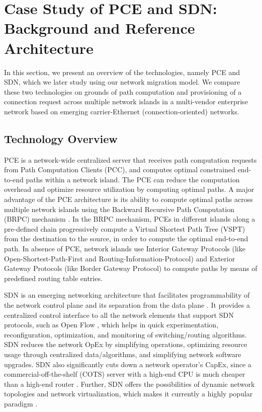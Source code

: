 \documentclass[smallextended]{svjour3}
\begin{document}
\section{Case Study of PCE and SDN: Background and Reference Architecture} \label{sec:reference architecture}

\par In this section, we present an overview of the technologies, namely PCE and
SDN, which we later study using our network migration model. We compare these
two technologies on grounds of path computation and provisioning of a connection
request across multiple network islands in a multi-vendor enterprise network
based on emerging carrier-Ethernet (connection-oriented) networks.

\par \subsection{Technology Overview} PCE is a network-wide centralized server
that receives path computation requests from Path Computation Clients (PCC), and
computes optimal constrained end-to-end paths within a network island.
The PCE can reduce the computation overhead and optimize resource utilization by
computing optimal paths. A major advantage of the PCE architecture is its
ability to compute optimal paths across multiple network islands using the
Backward Recursive Path Computation (BRPC) mechanism \cite{Vasseur09_2}.  In the
BRPC mechanism, PCEs in different islands along a pre-defined chain
progressively compute a Virtual Shortest Path Tree (VSPT) from the destination
to the source, in order to compute the optimal end-to-end path. In absence of
PCE, network islands use Interior Gateway Protocols (like
Open-Shortest-Path-First and Routing-Information-Protocol) and Exterior Gateway
Protocols (like Border Gateway Protocol) to compute paths by means of predefined
routing table entries.

\par SDN is an emerging networking architecture that facilitates programmability
of the network control plane and its separation from the data plane
\cite{SDN-onf-whitepaper}. It provides a centralized control interface to all
the network elements that support SDN protocols, such as Open Flow
\cite{openflow}, which helps in quick experimentation, reconfiguration,
optimization, and monitoring of switching/routing algorithms.
SDN reduces the network OpEx by simplifying operations, optimizing resource
usage through centralized data/algorithms, and simplifying network software
upgrades. SDN also significantly cuts down a network operator's CapEx, since a
commercial-off-the-shelf (COTS) server with a high-end CPU is much cheaper than a high-end router
\cite{metaswitch-whitepaper}. Further, SDN offers the possibilities of dynamic
network topologies and network virtualization, which makes it currently a highly
popular paradigm \cite{google-openflow}.
\end{document}
